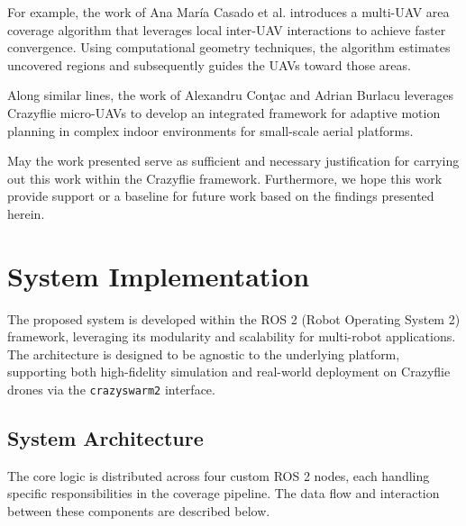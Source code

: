 \documentclass[conference]{IEEEtran}
\begin{document}
For example, the work of Ana María Casado et al. \cite{10.1117/12.3063062} introduces a multi-UAV area coverage algorithm that leverages local inter-UAV interactions to achieve faster convergence. Using computational geometry techniques, the algorithm estimates uncovered regions and subsequently guides the UAVs toward those areas.

Along similar lines, the work of Alexandru Conţac and Adrian Burlacu \cite{11240487} leverages Crazyflie micro-UAVs to develop an integrated framework for adaptive motion planning in complex indoor environments for small-scale aerial platforms.


May the work presented serve as sufficient and necessary justification for carrying out this work within the Crazyflie framework. Furthermore, we hope this work provide support or a baseline for future work based on the findings presented herein. 



\section{System Implementation} \label{sec:System Implementation}

The proposed system is developed within the ROS 2 (Robot Operating System 2) framework, leveraging its modularity and scalability for multi-robot applications. The architecture is designed to be agnostic to the underlying platform, supporting both high-fidelity simulation and real-world deployment on Crazyflie drones via the \texttt{crazyswarm2} interface.

\subsection{System Architecture}
The core logic is distributed across four custom ROS 2 nodes, each handling specific responsibilities in the coverage pipeline. The data flow and interaction between these components are described below.
\end{document}
